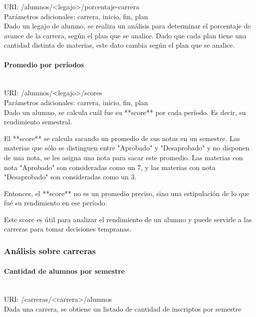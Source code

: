 URI: /alumnos/<legajo>/porcentaje-carrera \\

Parámetros adicionales: carrera, inicio, fin, plan \\

Dado un legajo de alumno, se realiza un análisis para determinar el porcentaje de avance de la carrera, según el plan que se analice. Dado que cada plan tiene una cantidad distinta de materias, este dato cambia según el plan que se analice.

\paragraph{Promedio por períodos}\mbox{}\\

URI: /alumnos/<legajo>/scores \\

Parámetros adicionales: carrera, inicio, fin, plan \\

Dado un alumno, se calcula cuál fue su **score** por cada período. Es decir, su rendimiento semestral. 

El **score** se calcula sacando un promedio de sus notas en un semestre. Las materias que sólo se distinguen entre "Aprobado" y "Desaprobado" y no disponen de una nota, se les asigna una nota para sacar este promedio.
Las materias con nota "Aprobado" son consideradas como un 7, y las materias con nota "Desaprobado" son consideradas como un 3.

Entonces, el **score** no es un promedio preciso, sino una estipulación de lo que fué su rendimiento en ese período.

Este score es útil para analizar el rendimiento de un alumno y puede servirle a las carreras para tomar decisiones tempranas.

\subsubsection{Análisis sobre carreras}

\paragraph{Cantidad de alumnos por semestre}\mbox{}\\

URI: /carreras/<carrera>/alumnos \\

Dada una carrera, se obtiene un listado de cantidad de inscriptos por semestre


